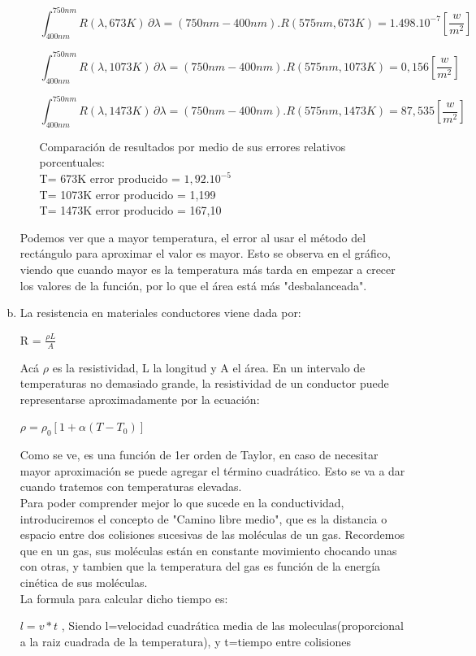 \documentclass[10pt,a4paper]{article}
\begin{document}
\begin{enumerate}[a)]
\begin{itemize}
\[
\int_{400 nm}^{750 nm} \! R( \lambda, 673K)  \,\partial \lambda = (750 nm - 400 nm).R( 575 nm, 673K)= 1.498 .10^{-7} \left[\frac{w}{m^2} \right]
\]

\[
\int_{400 nm}^{750 nm} \! R( \lambda, 1073K)  \,\partial \lambda  = (750 nm - 400 nm).R( 575 nm, 1073K)= 0,156 \left[\frac{w}{m^2} \right]
\]

\[
\int_{400 nm}^{750 nm} \! R( \lambda, 1473K)  \,\partial \lambda =
(750 nm - 400 nm).R( 575 nm, 1473K) = 87,535 \left[\frac{w}{m^2} \right]
\] 

\newpage

Comparación de resultados por medio de sus errores relativos porcentuales:\\
T= 673K		error producido = $1,92.10^{-5}$ \\
T= 1073K 	error producido = 1,199\\
T= 1473K 	error producido = 167,10\\
\end{itemize}

Podemos ver que a mayor temperatura, el error al usar el método del rectángulo para aproximar el valor es mayor. Esto se observa en el gráfico, viendo que cuando mayor es la temperatura más tarda en empezar a crecer los valores de la función, por lo que el área está más "desbalanceada".

\item La resistencia en materiales conductores viene dada por:\\
\begin{center}
R = $\frac{\rho L}{A}$
\end{center}

Acá $\rho $ es la resistividad, L la longitud y A el área.
En un intervalo de temperaturas no demasiado grande, la resistividad de un conductor puede representarse aproximadamente por la ecuación:
\begin{center}
$\rho = \rho_0[1 + \alpha(T - T_0)]$
\end{center}

Como se ve, es una función de 1er orden de Taylor, en caso de necesitar mayor aproximación se puede agregar el término cuadrático. Esto se va a dar cuando tratemos con temperaturas elevadas.\\

Para poder comprender mejor lo que sucede en la conductividad, introduciremos el concepto de "Camino libre medio", que es la distancia o espacio entre dos colisiones sucesivas de las moléculas de un gas. Recordemos que en un gas, sus moléculas están en constante movimiento chocando unas con otras, y tambien que
la temperatura del gas es función de la energía cinética de sus moléculas.\\
La formula para calcular dicho tiempo es:\\
\begin{center}
$l=v*t$ , Siendo l=velocidad cuadrática media de las moleculas(proporcional a la raiz cuadrada de la temperatura), y t=tiempo entre colisiones
\end{center}


\end{enumerate}
\end{document}
